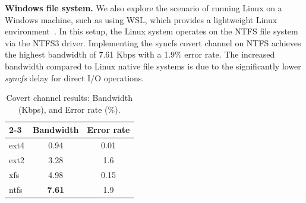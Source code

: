\textbf{Windows file system.} We also explore the scenario of running Linux on a Windows machine, such as using WSL, which provides a lightweight Linux environment~\cite{barnes2021pro}. In this setup, the Linux system operates on the NTFS file system via the NTFS3 driver. Implementing the syncfs covert channel on NTFS achieves the highest bandwidth of 7.61 Kbps with a 1.9\% error rate. The increased bandwidth compared to Linux native file systems is due to the significantly lower \textit{syncfs} delay for direct I/O operations. 



\begin{table}[tb]
\caption{Covert channel results: Bandwidth (Kbps), and Error rate (\%).}
\centering
\begin{tabular}{|l|c|c|} 
\cline{2-3}
\multicolumn{1}{c|}{\textbf{}} & \textbf{Bandwidth} & \textbf{Error rate} \\ \hline  \hline
ext4 &0.94  & 0.01 \\ \hline  
ext2  &3.28  &1.6   \\ \hline  
xfs &4.98 &0.15  \\ \hline 
ntfs &\textbf{7.61}   &1.9  \\ \hline 
\end{tabular}
\label{tb:covert_results}
\end{table}




